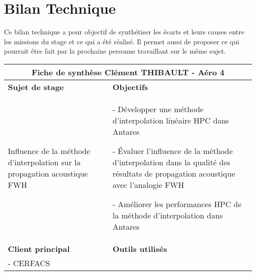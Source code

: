 \section*{Bilan Technique}
Ce bilan technique a pour objectif de synthétiser les écarts et leurs causes entre les missions du stage et ce qui a été réalisé.
Il permet aussi de proposer ce qui pourrait être fait par la prochaine personne travaillant sur le même sujet.


\begin{table}[ht]
\centering
\begin{tabular}{|p{6.5cm}|p{8.5cm}|}
\hline


\multicolumn{2}{|c|}{\textbf{Fiche de synthèse}   \hspace{7cm}   Clément THIBAULT - Aéro 4} \\ 
\hline
\textbf{Sujet de stage} & \textbf{Objectifs} \\ 
\hline


\begin{minipage}[t]{6.5cm}
Influence de la méthode d’interpolation sur la propagation acoustique FWH
\end{minipage} & 
\begin{minipage}[t]{8.5cm}
- Développer une méthode d’interpolation linéaire HPC dans Antares

- Évaluer l’influence de la méthode d’interpolation dans la qualité des résultats de propagation acoustique avec l’analogie FWH

- Améliorer les performances HPC de la méthode d’interpolation dans Antares
\end{minipage} \\ 
\hline
\textbf{Client principal} & \textbf{Outils utilisés} \\ 
\hline
\begin{minipage}[t]{6.5cm}
- CERFACS


\end{minipage}
\end{tabular}
\end{table}

